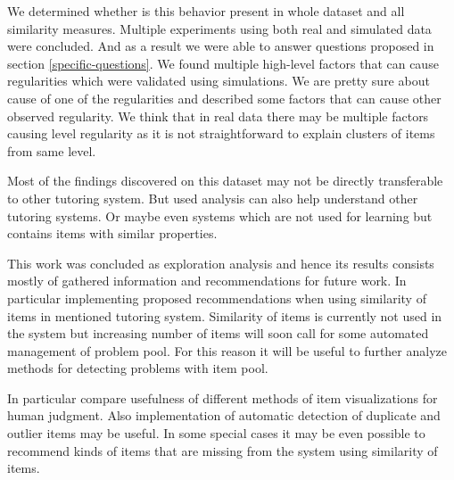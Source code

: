 \documentclass[
  digital, %
  table,   %
  nolof,     %
  nolot,     %
  nocover,
  color
]{fithesis3}
\begin{document}
We determined whether is this behavior present in whole dataset and all similarity measures. Multiple experiments using both real and simulated data were concluded. And as a result we were able to answer questions proposed in section \ref{specific-questions}. We found multiple high-level factors that can cause regularities which were validated using simulations. We are pretty sure about cause of one of the regularities and described some factors that can cause other observed regularity. We think that in real data there may be multiple factors causing level regularity as it is not straightforward to explain clusters of items from same level.

Most of the findings discovered on this dataset may not be directly transferable to other tutoring system. But used analysis can also help understand other tutoring systems. Or maybe even systems which are not used for learning but contains items with similar properties.


This work was concluded as exploration analysis and hence its results consists mostly of gathered information and recommendations for future work. In particular implementing proposed recommendations when using similarity of items in mentioned tutoring system. Similarity of items is currently not used in the system \umimeCesky{} but increasing number of items will soon call for some automated management of problem pool. For this reason it will be useful to further analyze methods for detecting problems with item pool.

In particular compare usefulness of different methods of item visualizations for human judgment. Also implementation of automatic detection of duplicate and outlier items may be useful. In some special cases it may be even possible to recommend kinds of items that are missing from the system using similarity of items.




\makeatletter\thesis@blocks@clear\makeatother

\end{document}
